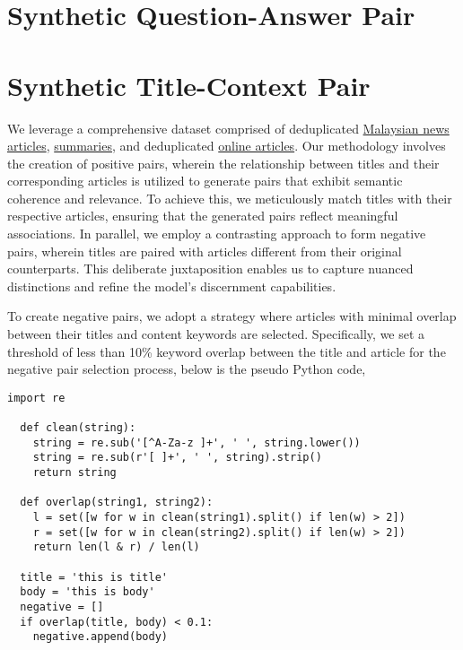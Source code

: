 \documentclass[preprint]{article}
\begin{document}
\section{Synthetic Question-Answer Pair}



\section{Synthetic Title-Context Pair}

We leverage a comprehensive dataset comprised of deduplicated \href{https://huggingface.co/datasets/malaysia-ai/dedup-text-dataset}{Malaysian news articles}, \href{https://huggingface.co/datasets/mesolitica/mixtral-malaysian-abstractive-summarization}{summaries}, and deduplicated \href{https://huggingface.co/datasets/malaysia-ai/dedup-text-dataset}{online articles}. Our methodology involves the creation of positive pairs, wherein the relationship between titles and their corresponding articles is utilized to generate pairs that exhibit semantic coherence and relevance. To achieve this, we meticulously match titles with their respective articles, ensuring that the generated pairs reflect meaningful associations. In parallel, we employ a contrasting approach to form negative pairs, wherein titles are paired with articles different from their original counterparts. This deliberate juxtaposition enables us to capture nuanced distinctions and refine the model's discernment capabilities.

To create negative pairs, we adopt a strategy where articles with minimal overlap between their titles and content keywords are selected. Specifically, we set a threshold of less than 10\% keyword overlap between the title and article for the negative pair selection process, below is the pseudo Python code,

\begin{lstlisting}[breaklines=true]
  import re

  def clean(string):
    string = re.sub('[^A-Za-z ]+', ' ', string.lower())
    string = re.sub(r'[ ]+', ' ', string).strip()
    return string

  def overlap(string1, string2):
    l = set([w for w in clean(string1).split() if len(w) > 2])
    r = set([w for w in clean(string2).split() if len(w) > 2])
    return len(l & r) / len(l)

  title = 'this is title'
  body = 'this is body'
  negative = []
  if overlap(title, body) < 0.1:
    negative.append(body)
\end{lstlisting}
\end{document}
